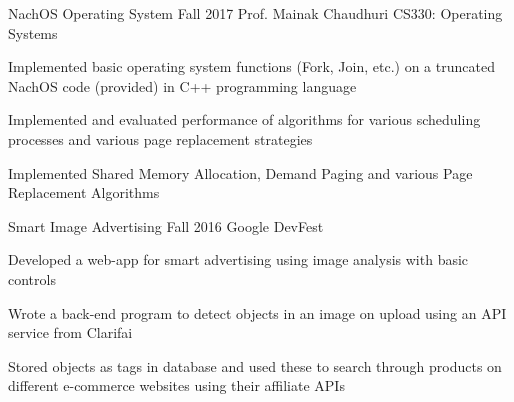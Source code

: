\begin{cventries}
	\cventry
	{NachOS Operating System}
	{}
	{Fall 2017}
	{Prof. Mainak Chaudhuri}
	{CS330: Operating Systems}
	{
		\begin{cvitems}
		\item Implemented basic operating system functions (Fork, Join, etc.) on a truncated NachOS code (provided) in C++ programming language
		\item Implemented and evaluated performance of algorithms for various scheduling processes and various page replacement strategies
		\item Implemented Shared Memory Allocation, Demand Paging and various Page Replacement Algorithms
		\end{cvitems}
	}

	\cventry
	{Smart Image Advertising}
	{}
	{Fall 2016}
	{}
	{Google DevFest}
	{
		\begin{cvitems}
		\item Developed a web-app for smart advertising using image analysis with basic controls
		\item Wrote a back-end program to detect objects in an image on upload using an API service from Clarifai
		\item Stored objects as tags in database and used these to search through products on different e-commerce websites using their affiliate APIs
		\end{cvitems}
	}

\end{cventries}

